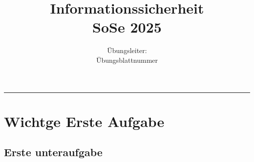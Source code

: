\newcommand{\dozent}{Volker Roth}
\newcommand{\veranstaltung}{Informationssicherheit}
\newcommand{\semester}{SoSe 2025}

\renewcommand{\thesection}{Aufgabe \arabic{section}:}
\renewcommand{\thesubsection}{\arabic{section}.\arabic{subsection} \hspace{0.25em}}



    \begin{titlepage}
        \subject{\dozent}
        \title{\veranstaltung \\ \semester\\ }
        \subtitle{\Large Übungsleiter:  \\
        Übungsblattnummer  }
        \date{\Large {}}
    \end{titlepage}

    \maketitle								%
    \vspace*{-11cm}							%

    \vspace{8cm}							%
    \rule{\linewidth}{0.8pt}				%

\section{Wichtge Erste Aufgabe}
\subsection{Erste unteraufgabe}

